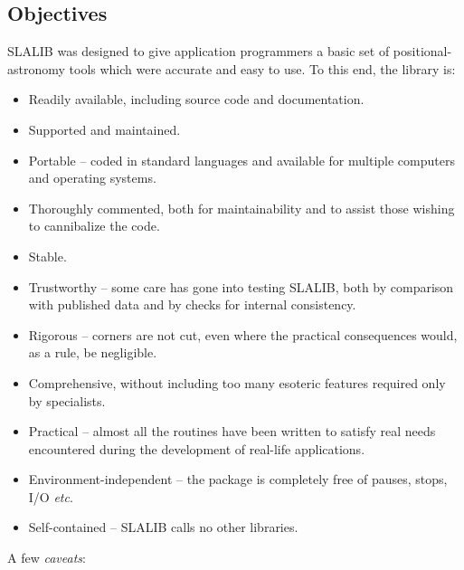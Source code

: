 \documentclass[11pt,twoside]{article}
\begin{document}
\subsection{Objectives}
SLALIB was designed to give application programmers
a basic set of positional-astronomy tools which were
accurate and easy to use.  To this end, the library is:
\begin{itemize}
\item Readily available, including source code and documentation.
\item Supported and maintained.
\item Portable -- coded in standard languages and available for
multiple computers and operating systems.
\item Thoroughly commented, both for maintainability and to
assist those wishing to cannibalize the code.
\item Stable.
\item Trustworthy -- some care has gone into
testing SLALIB, both by comparison with published data and
by checks for internal consistency.
\item Rigorous -- corners are not cut,
even where the practical consequences would, as a rule, be
negligible.
\item Comprehensive, without including too many esoteric features
required only by specialists.
\item Practical -- almost all the routines have been written to
satisfy real needs encountered during the development of
real-life applications.
\item Environment-independent -- the package is
completely free of pauses, stops, I/O {\it etc}.
\item Self-contained -- SLALIB calls no other libraries.
\end{itemize}
A few {\it caveats}:
\end{document}
